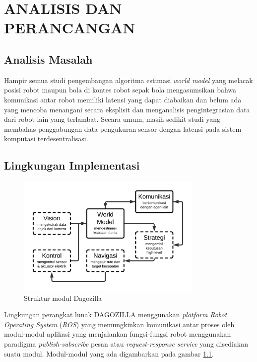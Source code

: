 \chapter{ANALISIS DAN PERANCANGAN}

\section{Analisis Masalah}

Hampir semua studi pengembangan algoritma estimasi \textit{world model} yang melacak posisi robot maupun bola di kontes robot sepak bola mengasumsikan bahwa komunikasi antar robot memiliki latensi yang dapat diabaikan dan belum ada yang mencoba menangani secara eksplisit dan menganalisis pengintegrasian data dari robot lain yang terlambat. Secara umum, masih sedikit studi yang membahas penggabungan data pengukuran sensor dengan latensi pada sistem komputasi terdesentralisasi.

\section{Lingkungan Implementasi}

\begin{figure}[h]
    \centering
    \includegraphics[width=0.8\textwidth]{resources/dagozilla-structure.png}
    \caption{Struktur modul Dagozilla}
    \label{fig:dagozilla-structure}
\end{figure}

Lingkungan perangkat lunak DAGOZILLA menggunakan \textit{platform} \textit{Robot Operating System} (\textit{ROS}) yang memungkinkan komunikasi antar proses oleh modul-modul aplikasi yang menjalankan fungsi-fungsi robot menggunakan paradigma \textit{publish-subscribe} pesan atau \textit{request-response} \textit{service} yang disediakan suatu modul. Modul-modul yang ada digambarkan pada gambar \ref{fig:dagozilla-structure}.

